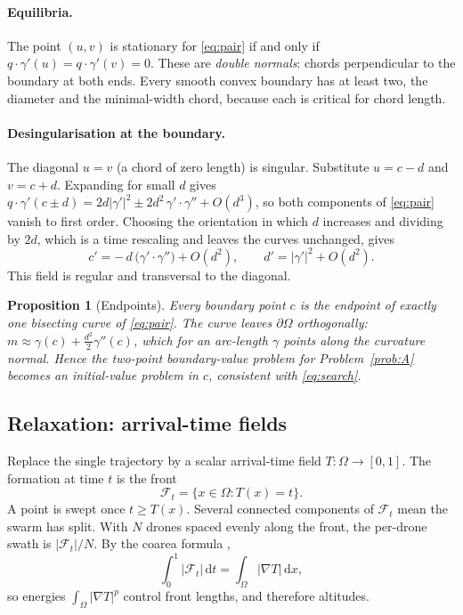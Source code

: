 \documentclass[11pt,a4paper]{article}
\numberwithin{equation}{section}
\theoremstyle{plain}
\newtheorem{proposition}{Proposition}[section]
\theoremstyle{definition}
\theoremstyle{remark}
\newcommand{\dd}{\mathrm{d}}
\newcommand{\pO}{\partial\Omega}
\begin{document}
\paragraph{Equilibria.} The point $(u,v)$ is stationary for \eqref{eq:pair} if and only if $q\cdot\gamma'(u)=q\cdot\gamma'(v)=0$. These are \emph{double normals}: chords perpendicular to the boundary at both ends. Every smooth convex boundary has at least two, the diameter and the minimal-width chord, because each is critical for chord length.

\paragraph{Desingularisation at the boundary.} The diagonal $u=v$ (a chord of zero length) is singular. Substitute $u=c-d$ and $v=c+d$. Expanding for small $d$ gives $q\cdot\gamma'(c\pm d)=2d|\gamma'|^2\pm2d^2\,\gamma'\!\cdot\gamma''+O(d^3)$, so both components of \eqref{eq:pair} vanish to first order. Choosing the orientation in which $d$ increases and dividing by $2d$, which is a time rescaling and leaves the curves unchanged, gives
\begin{equation}
c'=-\,d\,\bigl(\gamma'\cdot\gamma''\bigr)+O(d^2),\qquad d'=|\gamma'|^2+O(d^2).
\label{eq:desing}
\end{equation}
This field is regular and transversal to the diagonal.

\begin{proposition}[Endpoints]\label{prop:endpoints}
Every boundary point $c$ is the endpoint of exactly one bisecting curve of \eqref{eq:pair}. The curve leaves $\pO$ orthogonally: $m\approx\gamma(c)+\tfrac{d^2}{2}\gamma''(c)$, which for an arc-length $\gamma$ points along the curvature normal. Hence the two-point boundary-value problem for Problem~\ref{prob:A} becomes an initial-value problem in $c$, consistent with \eqref{eq:search}.
\end{proposition}

\subsection{Relaxation: arrival-time fields}
\label{sec:relax}

Replace the single trajectory by a scalar arrival-time field $T:\Omega\to[0,1]$. The formation at time $t$ is the front
\begin{equation}
\mathcal F_t=\{x\in\Omega: T(x)=t\}.
\label{eq:front}
\end{equation}
A point is swept once $t\ge T(x)$. Several connected components of $\mathcal F_t$ mean the swarm has split. With $N$ drones spaced evenly along the front, the per-drone swath is $|\mathcal F_t|/N$. By the coarea formula \citep{evans2010},
\begin{equation}
\int_0^1|\mathcal F_t|\,\dd t=\int_\Omega|\nabla T|\,\dd x ,
\label{eq:coarea}
\end{equation}
so energies $\int_\Omega|\nabla T|^p$ control front lengths, and therefore altitudes.
\end{document}
